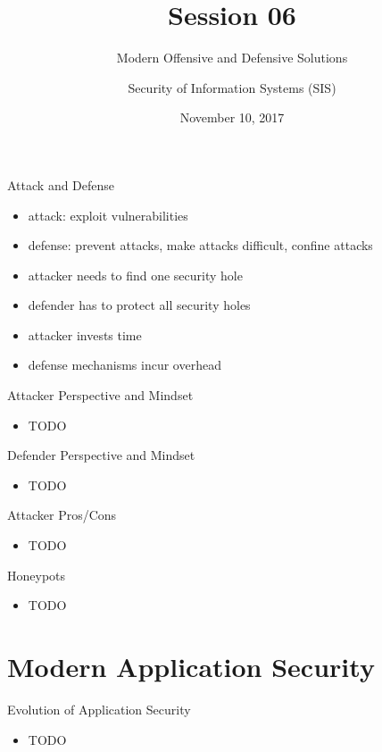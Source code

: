 \documentclass{curs}
\title[Session 06]{Session 06}
\subtitle{Modern Offensive and Defensive Solutions}
\author{Security of Information Systems (SIS)}
\date{November 10, 2017}
\begin{document}
\frame{\titlepage}

\begin{frame}{Attack and Defense}
  \begin{itemize}
    \item attack: exploit vulnerabilities
    \item defense: prevent attacks, make attacks difficult, confine attacks
    \item attacker needs to find one security hole
    \item defender has to protect all security holes
    \item attacker invests time
    \item defense mechanisms incur overhead
  \end{itemize}
\end{frame}

\begin{frame}{Attacker Perspective and Mindset}
  \begin{itemize}
    \item TODO
  \end{itemize}
\end{frame}

\begin{frame}{Defender Perspective and Mindset}
  \begin{itemize}
    \item TODO
  \end{itemize}
\end{frame}

\begin{frame}{Attacker Pros/Cons}
  \begin{itemize}
    \item TODO
  \end{itemize}
\end{frame}

\begin{frame}{Honeypots}
  \begin{itemize}
    \item TODO
  \end{itemize}
\end{frame}

\section{Modern Application Security}

\begin{frame}{Evolution of Application Security}
  \begin{itemize}
    \item TODO
  \end{itemize}
\end{frame}
\end{document}
